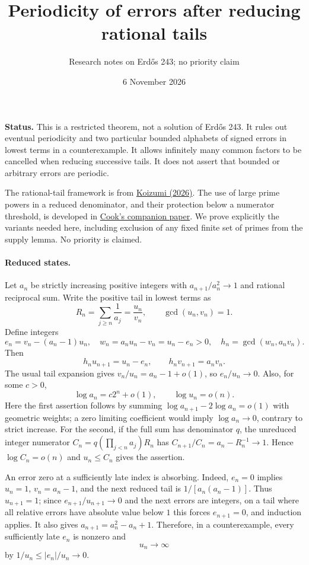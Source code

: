 \documentclass[11pt]{article}
\title{Periodicity of errors after reducing rational tails}
\author{Research notes on Erd\H{o}s 243; no priority claim}
\date{6 November 2026}
\begin{document}
\maketitle

\noindent\textbf{Status.} This is a restricted theorem, not a solution
of Erd\H{o}s 243. It rules out eventual periodicity and two particular
bounded alphabets of signed errors in lowest terms in a counterexample.
It allows infinitely many common
factors to be cancelled when reducing successive tails. It does not
assert that bounded or arbitrary errors are periodic.

The rational-tail framework is from
\href{https://math.colgate.edu/~integers/aa28/aa28.pdf}{Koizumi (2026)}.
The use of large prime powers in a reduced denominator, and their
protection below a numerator threshold, is developed in
\href{https://github.com/wcook04/plectis-erdos/blob/main/paper/243/erdos243-reciprocal-tail-reasoning-surface.tex}{Cook's companion paper}.
We prove explicitly the variants needed here, including exclusion of
any fixed finite set of primes from the supply lemma. No priority is
claimed.

\paragraph{Reduced states.}
Let $a_n$ be strictly increasing positive integers with
$a_{n+1}/a_n^2\to1$ and rational reciprocal sum. Write the positive tail
in lowest terms as
\[
 R_n=\sum_{j\ge n}\frac1{a_j}=\frac{u_n}{v_n},\qquad
 \gcd(u_n,v_n)=1.
\]
Define integers
\[
 e_n=v_n-(a_n-1)u_n,\quad
 w_n=a_nu_n-v_n=u_n-e_n>0,\quad
 h_n=\gcd(w_n,a_nv_n).
\]
Then
\begin{equation}\label{eq:reduced}
 h_nu_{n+1}=u_n-e_n,\qquad h_nv_{n+1}=a_nv_n.
\end{equation}
The usual tail expansion gives $v_n/u_n=a_n-1+o(1)$, so
$e_n/u_n\to0$. Also, for some $c>0$,
\begin{equation}\label{eq:growth}
 \log a_n=c2^n+o(1),\qquad \log u_n=o(n).
\end{equation}
Here the first assertion follows by summing
$\log a_{n+1}-2\log a_n=o(1)$ with geometric weights; a zero limiting
coefficient would imply $\log a_n\to0$, contrary to strict increase.
For the second, if the full sum has denominator $q$, the unreduced
integer numerator $C_n=q(\prod_{j<n}a_j)R_n$ has
$C_{n+1}/C_n=a_n-R_n^{-1}\to1$. Hence $\log C_n=o(n)$ and
$u_n\le C_n$ gives the assertion.

An error zero at a sufficiently late index is absorbing. Indeed,
$e_n=0$ implies $u_n=1$, $v_n=a_n-1$, and the next reduced tail is
$1/[a_n(a_n-1)]$. Thus $u_{n+1}=1$; since $e_{n+1}/u_{n+1}\to0$
and the next errors are integers, on a tail where all relative errors
have absolute value below $1$ this forces $e_{n+1}=0$, and induction
applies. It also gives $a_{n+1}=a_n^2-a_n+1$. Therefore, in a
counterexample, every sufficiently late $e_n$ is nonzero and
\begin{equation}\label{eq:udiverges}
 u_n\longrightarrow\infty
\end{equation}
by $1/u_n\le|e_n|/u_n\to0$.
\end{document}
